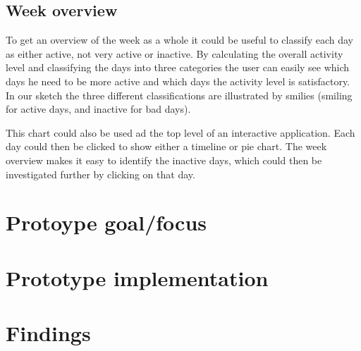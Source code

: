 \subsection{Week overview}
To get an overview of the week as a whole it could be useful to classify each day as either active, not very active or inactive. By calculating the overall activity level and classifying the days into three categories the user can easily see which days he need to be more active and which days the activity level is satisfactory. In our sketch the three different classifications are illustrated by smilies (smiling for active days, and inactive for bad days). 

This chart could also be used ad the top level of an interactive application. Each day could then be clicked to show either a timeline or pie chart. The week overview makes it easy to identify the inactive days, which could then be investigated further by clicking on that day.

\section{Protoype goal/focus}

\section{Prototype implementation}

\section{Findings}
